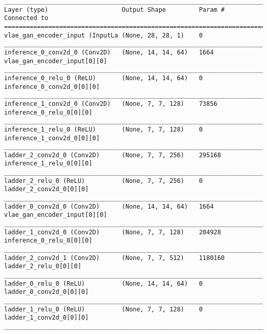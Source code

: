 \begin{lstlisting}[caption={\textsc{Mnist}-\ac{VLAE}-\ac{GAN} Encoder},captionpos=b,basicstyle=\tiny, label={lst:mnist-vlae-gan-encoder}]
__________________________________________________________________________________________________
Layer (type)                    Output Shape         Param #     Connected to
==================================================================================================
vlae_gan_encoder_input (InputLa (None, 28, 28, 1)    0
__________________________________________________________________________________________________
inference_0_conv2d_0 (Conv2D)   (None, 14, 14, 64)   1664        vlae_gan_encoder_input[0][0]
__________________________________________________________________________________________________
inference_0_relu_0 (ReLU)       (None, 14, 14, 64)   0           inference_0_conv2d_0[0][0]
__________________________________________________________________________________________________
inference_1_conv2d_0 (Conv2D)   (None, 7, 7, 128)    73856       inference_0_relu_0[0][0]
__________________________________________________________________________________________________
inference_1_relu_0 (ReLU)       (None, 7, 7, 128)    0           inference_1_conv2d_0[0][0]
__________________________________________________________________________________________________
ladder_2_conv2d_0 (Conv2D)      (None, 7, 7, 256)    295168      inference_1_relu_0[0][0]
__________________________________________________________________________________________________
ladder_2_relu_0 (ReLU)          (None, 7, 7, 256)    0           ladder_2_conv2d_0[0][0]
__________________________________________________________________________________________________
ladder_0_conv2d_0 (Conv2D)      (None, 14, 14, 64)   1664        vlae_gan_encoder_input[0][0]
__________________________________________________________________________________________________
ladder_1_conv2d_0 (Conv2D)      (None, 7, 7, 128)    204928      inference_0_relu_0[0][0]
__________________________________________________________________________________________________
ladder_2_conv2d_1 (Conv2D)      (None, 7, 7, 512)    1180160     ladder_2_relu_0[0][0]
__________________________________________________________________________________________________
ladder_0_relu_0 (ReLU)          (None, 14, 14, 64)   0           ladder_0_conv2d_0[0][0]
__________________________________________________________________________________________________
ladder_1_relu_0 (ReLU)          (None, 7, 7, 128)    0           ladder_1_conv2d_0[0][0]
__________________________________________________________________________________________________

\end{lstlisting}
